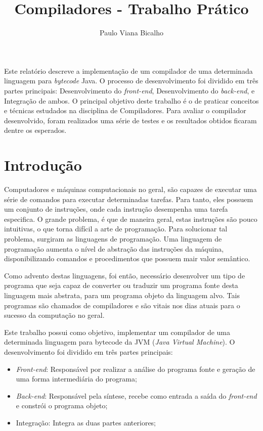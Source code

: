 \documentclass[12pt]{article}
\title{Compiladores - Trabalho Prático }
\author{Paulo Viana Bicalho\inst{1}}
\begin{document}
 

\maketitle

     
\begin{resumo} 
  Este relatório descreve a implementação de um compilador de uma determinada linguagem para \textit{bytecode} Java. O processo de desenvolvimento foi dividido em três partes principais: Desenvolvimento do \textit{front-end}, Desenvolvimento do \textit{back-end}, e Integração de ambos. O principal objetivo deste trabalho é o de praticar conceitos e técnicas estudados na disciplina de Compiladores. Para avaliar o compilador desenvolvido, foram realizados uma série de testes e os resultados obtidos ficaram dentre os esperados.
\end{resumo}


\section{Introdução}

Computadores e máquinas computacionais no geral, são capazes de executar uma série de comandos para executar determinadas tarefas.
Para tanto, eles possuem um conjunto de instruções, onde cada instrução desempenha uma tarefa especifica. O grande problema, é que de maneira geral, estas instruções são pouco intuitivas, o que torna difícil a arte de programação. Para solucionar tal problema, surgiram as linguagens de programação. Uma linguagem de programação aumenta o nível de abstração das instruções da máquina, disponibilizando comandos e procedimentos que possuem mair valor semântico.

Como advento destas linguagens, foi então, necessário desenvolver um tipo de programa que seja capaz de converter ou traduzir um programa fonte desta linguagem mais abstrata, para um programa objeto da linguagem alvo. Tais programas são chamados de compiladores e são vitais nos dias atuais para o sucesso da computação no geral.

Este trabalho possui como objetivo, implementar um compilador de uma determinada linguagem para bytecode da JVM (\textit{Java Virtual Machine}). O desenvolvimento foi dividido em três partes principais:

\begin{itemize}
	\item \textit{Front-end}: Responsável por realizar a análise do programa fonte e geração de uma forma intermediária do programa;
	\item \textit{Back-end}: Responsável pela síntese, recebe como entrada a saída do \textit{front-end} e constrói o programa objeto;
	\item Integração: Integra as duas partes anteriores;
\end{itemize}
\end{document}
